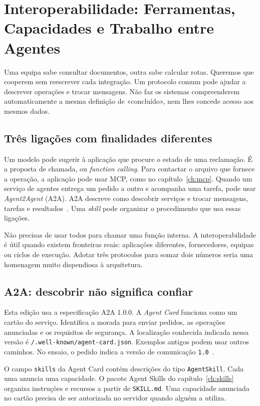 \chapter{Interoperabilidade: Ferramentas, Capacidades e Trabalho entre Agentes}
\label{ch:interop}

Uma equipa sabe consultar documentos, outra sabe calcular rotas. Queremos que cooperem sem reescrever cada integração. Um protocolo comum pode ajudar a descrever operações e trocar mensagens. Não faz os sistemas compreenderem automaticamente a mesma definição de «concluído», nem lhes concede acesso aos mesmos dados.

\section{Três ligações com finalidades diferentes}
Um modelo pode sugerir à aplicação que procure o estado de uma reclamação. É a proposta de chamada, ou \emph{function calling}. Para contactar o arquivo que fornece a operação, a aplicação pode usar MCP, como no capítulo~\ref{ch:mcp}. Quando um serviço de agentes entrega um pedido a outro e acompanha uma tarefa, pode usar \emph{Agent2Agent} (A2A). A2A descreve como descobrir serviços e trocar mensagens, tarefas e resultados~\citep{a2a2026}. Uma \emph{skill} pode organizar o procedimento que usa essas ligações.

Não precisas de usar todos para chamar uma função interna. A interoperabilidade é útil quando existem fronteiras reais: aplicações diferentes, fornecedores, equipas ou ciclos de execução. Adotar três protocolos para somar dois números seria uma homenagem muito dispendiosa à arquitetura.

\section{A2A: descobrir não significa confiar}
Esta edição usa a especificação A2A 1.0.0. A \emph{Agent Card} funciona como um cartão do serviço. Identifica a morada para enviar pedidos, as operações anunciadas e os requisitos de segurança. A localização conhecida indicada nessa versão é \texttt{/.well-known/agent-card.json}. Exemplos antigos podem usar outros caminhos. No ensaio, o pedido indica a versão de comunicação \texttt{1.0}~\citep{a2a2026}.

O campo \texttt{skills} da Agent Card contém descrições do tipo \texttt{AgentSkill}. Cada uma anuncia uma capacidade. O pacote Agent Skills do capítulo~\ref{ch:skills} organiza instruções e recursos a partir de \texttt{SKILL.md}. Uma capacidade anunciada no cartão precisa de ser autorizada no servidor quando alguém a utiliza.

